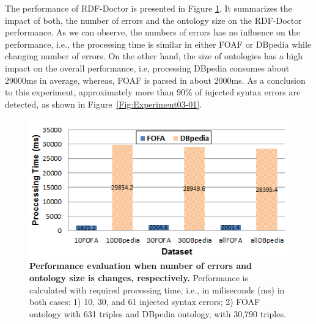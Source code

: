 The performance of RDF-Doctor is presented in Figure \ref{Fig:Experiment03-03}. 
It summarizes the impact of both, the number of errors and the ontology size on the RDF-Doctor performance.
As we can observe, the numbers of errors has no influence on the performance, i.e., the processing time is similar in either FOAF or DBpedia while changing number of errors. 
On the other hand, the size of ontologies has a high impact on the overall performance, i.e, processing DBpedia consumes about 29000ms in average, whereas, FOAF is parsed in about 2000ms.   
As a conclusion to this experiment, approximately more than 90\% of injected syntax errors are detected, as shown in Figure~\ref{Fig:Experiment03-01}. 

\begin{figure}[ht]
\begin{center}
		\includegraphics[scale=1,angle=0]{images/Experiment03-03.png}
		\setlength\abovecaptionskip{-20mm}
		\setlength\belowcaptionskip{-5mm}
		\caption{\textbf{Performance evaluation when number of errors and ontology size is changes, respectively.} 
		Performance is calculated with required processing time, i.e., in miliseconds (ms) in both cases: 1) 10, 30, and 61 injected syntax errors; 2) FOAF ontology with 631 triples and DBpedia ontology, with 30,790 triples.}
\label{Fig:Experiment03-03}

\end{center}
\end{figure}
